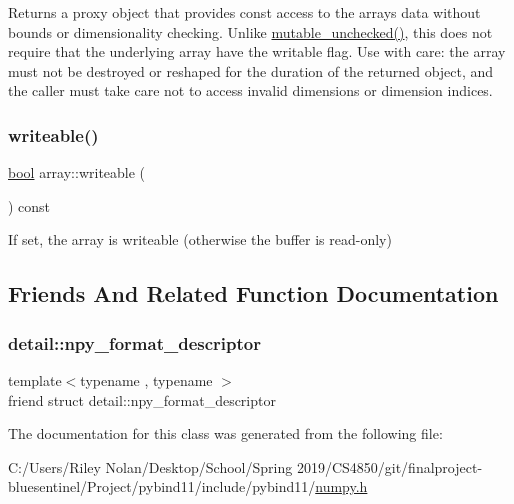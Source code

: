 Returns a proxy object that provides const access to the array\textquotesingle{}s data without bounds or dimensionality checking. Unlike {\ttfamily \mbox{\hyperlink{classarray_a93018344b9a8d27eacbdd7837f6efcab}{mutable\+\_\+unchecked()}}}, this does not require that the underlying array have the {\ttfamily writable} flag. Use with care\+: the array must not be destroyed or reshaped for the duration of the returned object, and the caller must take care not to access invalid dimensions or dimension indices. \mbox{\label{classarray_a9c19f81ca43feebd34b2c9dd5b38f1d9}} 
\subsubsection{\texorpdfstring{writeable()}{writeable()}}
{\footnotesize\ttfamily \mbox{\hyperlink{asdl_8h_af6a258d8f3ee5206d682d799316314b1}{bool}} array\+::writeable (\begin{DoxyParamCaption}{ }\end{DoxyParamCaption}) const\hspace{0.3cm}{\ttfamily [inline]}}



If set, the array is writeable (otherwise the buffer is read-\/only) 



\subsection{Friends And Related Function Documentation}
\mbox{\label{classarray_a2d7124af4924ef006d3b7bfd42b05085}} 
\subsubsection{\texorpdfstring{detail::npy\_format\_descriptor}{detail::npy\_format\_descriptor}}
{\footnotesize\ttfamily template$<$typename , typename $>$ \\
friend struct detail\+::npy\+\_\+format\+\_\+descriptor\hspace{0.3cm}{\ttfamily [friend]}}



The documentation for this class was generated from the following file\+:\begin{DoxyCompactItemize}
\item 
C\+:/\+Users/\+Riley Nolan/\+Desktop/\+School/\+Spring 2019/\+C\+S4850/git/finalproject-\/bluesentinel/\+Project/pybind11/include/pybind11/\mbox{\hyperlink{numpy_8h}{numpy.\+h}}\end{DoxyCompactItemize}
